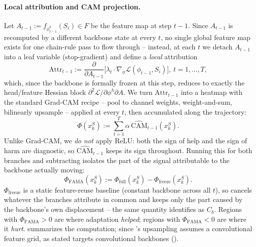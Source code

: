 \paragraph{Local attribution and CAM projection.}
Let $A_{t-1}:=f_{\phi_{t-1}^b}(S_i)\in F$ be the feature map at step $t{-}1$. Since $A_{t-1}$ is recomputed by a different backbone state at every $t$, no single global feature map exists for one chain-rule pass to flow through -- instead, at each $t$ we detach $A_{t-1}$ into a leaf variable (stop-gradient) and define a \emph{local} attribution
\begin{equation}
    \mathrm{Attr}_{t-1} := \frac{\partial}{\partial A_{t-1}}\Big[\lambda_t\!\cdot\!\nabla_\phi\mathcal{L}(\phi_{t-1},S_i)\Big],\ t=1,\dots,T,
    \label{eq:local_attr}
\end{equation}
which, since the backbone is formally frozen at this step, reduces to exactly the head/feature Hessian block $\partial^2\mathcal{L}/\partial\phi^h\partial A$. We turn $\mathrm{Attr}_{t-1}$ into a heatmap with the standard Grad-CAM recipe \citep{selvaraju2020grad} -- pool to channel weights, weight-and-sum, bilinearly upsample -- applied at every $t$, then accumulated along the trajectory:
\begin{equation}
    \Phi(x_k^S) := \sum_{t=1}^{T}\alpha\,\widehat{\mathrm{CAM}}_{t-1}(x_k^S).
    \label{eq:branch_saliency}
\end{equation}
Unlike Grad-CAM, we \emph{do not} apply ReLU: both the sign of help and the sign of harm are diagnostic, so $\widehat{\mathrm{CAM}}_{t-1}$ keeps its sign throughout. Running this for both branches and subtracting isolates the part of the signal attributable to the backbone actually moving:
\begin{equation}
    \boxed{\ \Phi_{\mathrm{FAMA}}(x_k^S) := \Phi_{\mathrm{full}}(x_k^S) - \Phi_{\mathrm{freeze}}(x_k^S).\ }
    \label{eq:fama_final}
\end{equation}
$\Phi_{\mathrm{freeze}}$ is a static feature-reuse baseline (constant backbone across all $t$), so  cancels whatever the branches attribute in common and keeps only the part caused by the backbone's own displacement -- the same quantity  identifies as $C_b$. Regions with $\Phi_{\mathrm{FAMA}}{>}0$ are where adaptation \emph{helped}; regions with $\Phi_{\mathrm{FAMA}}{<}0$ are where it \emph{hurt}.  summarizes the computation; since 's upsampling assumes a convolutional feature grid, \fama as stated targets convolutional backbones ().

